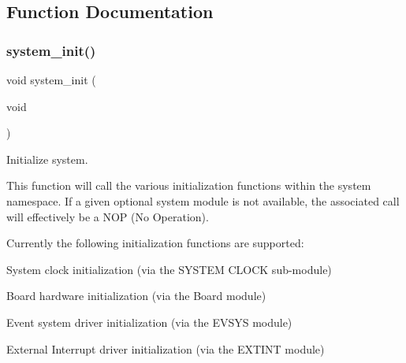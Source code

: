 \subsection{Function Documentation}
\mbox{\label{group__asfdoc__sam0__system__group_ga43f5e0d6db0fb41a437cc9096b32e9b5}} 
\subsubsection{\texorpdfstring{system\_init()}{system\_init()}}
{\footnotesize\ttfamily void system\+\_\+init (\begin{DoxyParamCaption}\item[{void}]{ }\end{DoxyParamCaption})}



Initialize system. 

This function will call the various initialization functions within the system namespace. If a given optional system module is not available, the associated call will effectively be a N\+OP (No Operation).

Currently the following initialization functions are supported\+:
\begin{DoxyItemize}
\item System clock initialization (via the S\+Y\+S\+T\+EM C\+L\+O\+CK sub-\/module)
\item Board hardware initialization (via the Board module)
\item Event system driver initialization (via the E\+V\+S\+YS module)
\item External Interrupt driver initialization (via the E\+X\+T\+I\+NT module) 
\end{DoxyItemize}